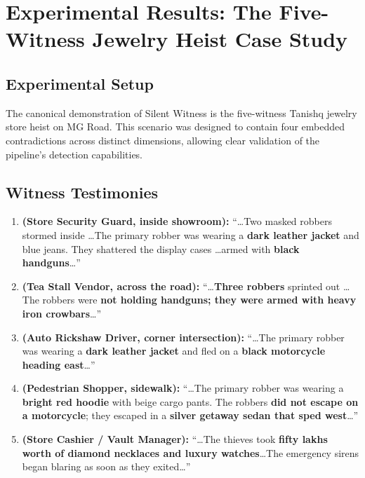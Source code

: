 \documentclass[12pt,a4paper]{report}
\begin{document}
\chapter{Experimental Results: The Five-Witness Jewelry Heist Case Study}

\section{Experimental Setup}

The canonical demonstration of Silent Witness is the five-witness Tanishq jewelry store heist on MG Road. This scenario was designed to contain four embedded contradictions across distinct dimensions, allowing clear validation of the pipeline's detection capabilities.

\section{Witness Testimonies}

\begin{enumerate}[leftmargin=2cm, label=\textbf{Witness \arabic*.}]
    \item \textbf{(Store Security Guard, inside showroom):} ``\ldots Two masked robbers stormed inside \ldots The primary robber was wearing a \textbf{dark leather jacket} and blue jeans. They shattered the display cases \ldots armed with \textbf{black handguns}\ldots''
    
    \item \textbf{(Tea Stall Vendor, across the road):} ``\ldots \textbf{Three robbers} sprinted out \ldots The robbers were \textbf{not holding handguns; they were armed with heavy iron crowbars}\ldots''
    
    \item \textbf{(Auto Rickshaw Driver, corner intersection):} ``\ldots The primary robber was wearing a \textbf{dark leather jacket} and fled on a \textbf{black motorcycle heading east}\ldots''
    
    \item \textbf{(Pedestrian Shopper, sidewalk):} ``\ldots The primary robber was wearing a \textbf{bright red hoodie} with beige cargo pants. The robbers \textbf{did not escape on a motorcycle}; they escaped in a \textbf{silver getaway sedan that sped west}\ldots''
    
    \item \textbf{(Store Cashier / Vault Manager):} ``\ldots The thieves took \textbf{fifty lakhs worth of diamond necklaces and luxury watches}\ldots The emergency sirens began blaring as soon as they exited\ldots''
\end{enumerate}
\end{document}

